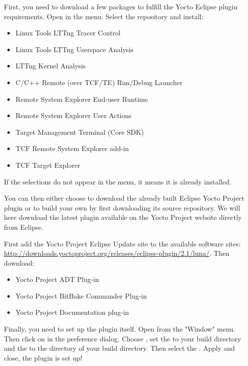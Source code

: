 First, you need to download a few packages to fulfill the Yocto
Eclipse plugin requirements. Open  in the
 menu. Select the 
 repository and install:
\begin{itemize}
  \item Linux Tools LTTng Tracer Control
  \item Linux Tools LTTng Userspace Analysis
  \item LTTng Kernel Analysis
  \item C/C++ Remote (over TCF/TE) Run/Debug Launcher
  \item Remote System Explorer End-user Runtime
  \item Remote System Explorer User Actions
  \item Target Management Terminal (Core SDK)
  \item TCF Remote System Explorer add-in
  \item TCF Target Explorer
\end{itemize}

If the selections do not appear in the menu, it means it is already installed.

You can then either choose to download the already built Eclipse Yocto Project
plugin or to build your own by first downloading its source repository. We will
here download the latest plugin available on the Yocto Project website directly
from Eclipse.

First add the Yocto Project Eclipse Update site to the available software sites:
\url{http://downloads.yoctoproject.org/releases/eclipse-plugin/2.1/luna/}.
Then download:
\begin{itemize}
  \item Yocto Project ADT Plug-in
  \item Yocto Project BitBake Commander Plug-in
  \item Yocto Project Documentation plug-in
\end{itemize}

Finally, you need to set up the plugin itself. Open  from the
"Window" menu. Then click on  in the preference dialog.
Choose , set the  to your build directory and the  to the
 directory of your build directory. Then select the
. Apply and close, the plugin is set up!

